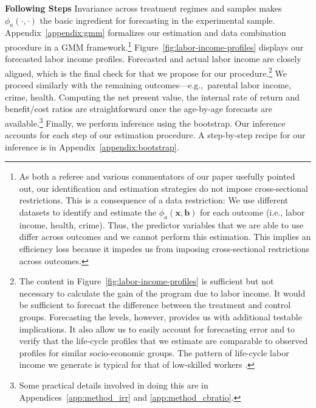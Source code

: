 \noindent \textbf{Following Steps} \label{section:following} Invariance across treatment regimes and samples makes $\phi_{a} (\cdot, \cdot)$ the basic ingredient for forecasting in the experimental sample. Appendix~\ref{appendix:gmm} formalizes our estimation and data combination procedure in a GMM framework.\footnote{As both a referee and various commentators of our paper usefully pointed out, our identification and estimation strategies do not impose cross-sectional restrictions. This is a consequence of a data restriction: We use different datasets to identify and estimate the  $\phi_{a} \left( \bm{x}, \bm{b} \right)$ for each outcome (i.e., labor income, health, crime). Thus, the predictor variables that we are able to use differ across outcomes and we cannot perform this estimation. This implies an efficiency loss because it impedes us from imposing cross-sectional restrictions across outcomes.} Figure~\ref{fig:labor-income-profiles} displays our forecasted labor income profiles. Forecasted and actual labor income are closely aligned, which is the final check for that we propose for our procedure.\footnote{The content in Figure~\ref{fig:labor-income-profiles} is sufficient but not necessary to calculate the gain of the program due to labor income. It would be sufficient to forecast the difference between the treatment and control groups. Forecasting the levels, however, provides us with additional testable implications. It also allow us to easily account for forecasting error and to verify that the life-cycle profiles that we estimate are comparable to observed profiles for similar socio-economic groups. The pattern of life-cycle labor income we generate is typical for that of low-skilled workers \citep{Blundell-etal_2015_J-Pub-E,Gladden_Taber_2000_WageProgression,Sanders-Taber_2012_AR,Lagakos_Moll_etal_2016_LifeCycle_NBER}.} We proceed similarly with the remaining outcomes---e.g.,\ parental labor income, crime, health. Computing the net present value, the internal rate of return and benefit/cost ratios are straightforward once the age-by-age forecasts are available.\footnote{Some practical details involved in doing this are in Appendices~\ref{app:method_irr} and \ref{app:method_cbratio}.} Finally, we perform inference using the  bootstrap. Our inference accounts for each step of our estimation procedure. A step-by-step recipe for our inference is in Appendix~\ref{appendix:bootstrap}.

